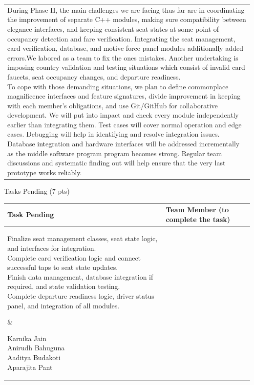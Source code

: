 \documentclass[12pt,a4paper]{article}
\newcommand{\sectiontitle}[1]{%
    {\color{GEUBlue}
    \fontsize{18}{22}\selectfont #1}
}
\newcommand{\instruction}[1]{%
    {\color{InstructionGrey}
    \fontsize{10.5}{13}\selectfont #1}
}
\newcommand{\answerbox}[2]{%
    \begin{tabularx}{\textwidth}{
        |>{\raggedright\arraybackslash}X|}
        \hline
        \parbox[t][#1][t]{\dimexpr\linewidth-12pt\relax}{
            \vspace{5pt}
            \fontsize{11}{13}\selectfont #2
        }\\
        \hline
    \end{tabularx}
}
\begin{document}
\answerbox{6.8cm}{During Phase II, the main challenges we are facing thus far are in coordinating the improvement of separate C++ modules, making sure compatibility between elegance interfaces, and keeping consistent seat states at some point of occupancy detection and fare verification. Integrating the seat management, card verification, database, and motive force panel modules additionally added errors.We labored as a team to fix the ones mistakes. Another undertaking is imposing country validation and testing situations which consist of invalid card faucets, seat occupancy changes, and departure readiness.\\[0.2cm]
To cope with those demanding situations, we plan to define commonplace magnificence interfaces and feature signatures, divide improvement in keeping with each member's obligations, and use Git/GitHub for collaborative development. We will put into impact and check every module independently earlier than integrating them.
Test cases will cover normal operation and edge cases. Debugging will help in identifying and resolve integration issues. Database integration and hardware interfaces will be addressed incrementally as the middle software program program becomes strong.
Regular team discussions and systematic finding out will help ensure that the very last prototype works reliably.

}

\vspace{0.65cm}

\sectiontitle{Tasks Pending (7 pts)}

\vspace{0.05cm}


\vspace{0.18cm}

\begin{tabularx}{\textwidth}{
|>{\raggedright\arraybackslash}X
|>{\raggedright\arraybackslash}X|
}
\hline

\textbf{Task Pending} &
\textbf{Team Member (to complete the task)}
\\
\hline

\parbox[t][5.25cm][t]{\linewidth}{Finalize seat management classes, seat state logic, and interfaces for integration.\\[0.2cm]
Complete card verification logic and connect \\successful taps to seat state updates.\\[0.2cm]
Finish data management, database integration if required, and state validation testing.\\[0.2cm]
Complete departure readiness logic, driver status panel, and integration of all modules.}
&
\parbox[t][5.25cm][t]{\linewidth}{{Karnika Jain\\[0.7cm]
Anirudh Bahuguna\\[0.7cm]
Aaditya Budakoti\\[0.7cm]
Aparajita Pant}}
\\
\hline

\end{tabularx}
\end{document}
